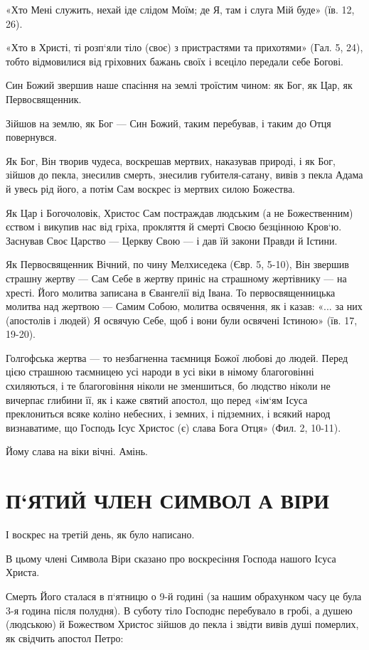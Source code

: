 \documentclass[main.tex]{subfiles}
\begin{document}
«Хто Мені служить, нехай іде слідом Моїм; де Я, там і слуга Мій буде» (їв. 12, 26).

«Хто в Христі, ті розп`яли тіло (своє) з пристрастями та прихотями» (Гал. 5, 24), тобто відмовилися від гріховних бажань своїх і всеціло передали себе Богові.

Син Божий звершив наше спасіння на землі троїстим чином: як Бог, як Цар, як Первосвященник.

Зійшов на землю, як Бог — Син Божий, таким перебував, і таким до Отця повернувся.

Як Бог, Він творив чудеса, воскрешав мертвих, наказував природі, і як Бог, зійшов до пекла, знесилив смерть, знесилив губителя-сатану, вивів з пекла Адама й увесь рід його, а потім Сам воскрес із мертвих силою Божества.

Як Цар і Богочоловік, Христос Сам постраждав людським (а не Божественним) єством і викупив нас від гріха, прокляття й смерті Своєю безцінною Кров`ю. Заснував Своє Царство — Церкву Свою — і дав їй закони Правди й Істини.

Як Первосвященник Вічний, по чину Мелхиседека (Євр. 5, 5-10), Він звершив страшну жертву — Сам Себе в жертву приніс на страшному жертівнику — на хресті. Його молитва записана в Євангелії від Івана. То первосвященницька молитва над жертвою — Самим Собою, молитва освячення, як і казав: «... за них (апостолів і людей) Я освячую Себе, щоб і вони були освячені Істиною» (їв. 17, 19-20).

Голгофська жертва — то незбагненна таємниця Божої любові до людей. Перед цією страшною таємницею усі народи в усі віки в німому благоговінні схиляються, і те благоговіння ніколи не зменшиться, бо людство ніколи не вичерпає глибини її, як і каже святий апостол, що перед «ім`ям Ісуса преклониться всяке коліно небесних, і земних, і підземних, і всякий народ визнаватиме, що Господь Ісус Христос (є) слава Бога Отця» (Фил. 2, 10-11).

Йому слава на віки вічні. Амінь.

\section{П`ЯТИЙ ЧЛЕН СИМВОЛ А ВІРИ} 

І воскрес на третій день, як було написано.

В цьому члені Символа Віри сказано про воскресіння Господа нашого Ісуса Христа.

Смерть Його сталася в п`ятницю о 9-й годині (за нашим обрахунком часу це була 3-я година після полудня). В суботу тіло Господнє перебувало в гробі, а душею (людською) й Божеством Христос зійшов до пекла і звідти вивів душі померлих, як свідчить апостол Петро:
\end{document}
